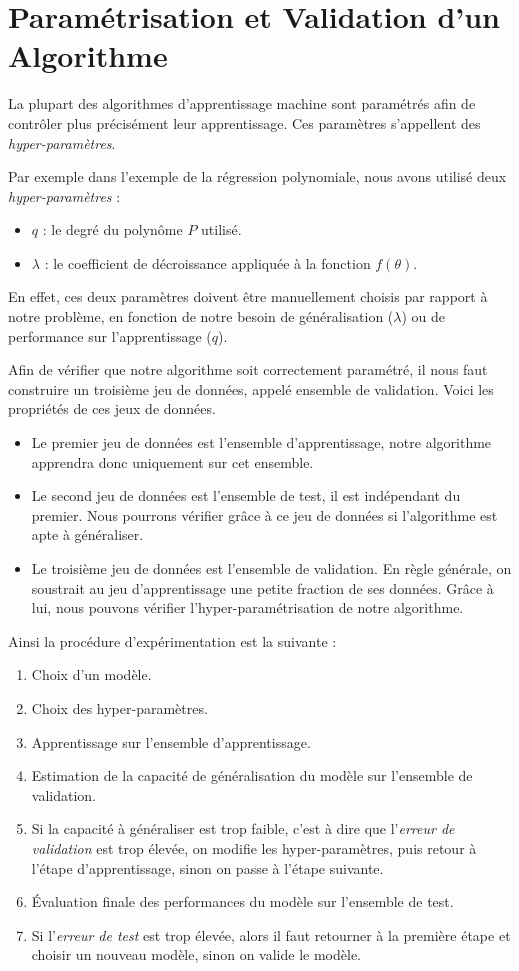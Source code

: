\documentclass[a4paper, 11pt]{report}
\begin{document}
\section{Paramétrisation et Validation d'un Algorithme}
La plupart des algorithmes d'apprentissage machine sont paramétrés afin de contrôler plus précisément leur apprentissage.
Ces paramètres s'appellent des \emph{hyper-paramètres}.

Par exemple dans l'exemple de la régression polynomiale, nous avons utilisé deux \emph{hyper-paramètres} :
\begin{itemize}
	\item $q$ : le degré du polynôme $P$ utilisé.
	\item $\lambda$ : le coefficient de décroissance appliquée à la fonction $f(\theta)$.
\end{itemize}
En effet, ces deux paramètres doivent être manuellement choisis par rapport à notre problème, en fonction de notre besoin de généralisation ($\lambda$) ou de performance sur l'apprentissage ($q$).

Afin de vérifier que notre algorithme soit correctement paramétré, il nous faut construire un troisième jeu de données, appelé ensemble de validation.
Voici les propriétés de ces jeux de données.
\begin{itemize}
	\item Le premier jeu de données est l'ensemble d'apprentissage, notre algorithme apprendra donc uniquement sur cet ensemble.
	\item Le second jeu de données est l'ensemble de test, il est indépendant du premier. Nous pourrons vérifier grâce à ce jeu de données si l'algorithme est apte à généraliser.
	\item Le troisième jeu de données est l'ensemble de validation. En règle générale, on soustrait au jeu d'apprentissage une petite fraction de ses données. Grâce à lui, nous pouvons vérifier l'hyper-paramétrisation de notre algorithme.
\end{itemize}
Ainsi la procédure d'expérimentation est la suivante :
\begin{enumerate}
	\item Choix d'un modèle.
	\item Choix des hyper-paramètres.
	\item Apprentissage sur l'ensemble d'apprentissage.
	\item Estimation de la capacité de généralisation du modèle sur l'ensemble de validation.
	\item Si la capacité à généraliser est trop faible, c'est à dire que l'\emph{erreur de validation} est trop élevée, on modifie les hyper-paramètres, puis retour à l'étape d'apprentissage, sinon on passe à l'étape suivante.
	\item Évaluation finale des performances du modèle sur l'ensemble de test.
	\item Si l'\emph{erreur de test} est trop élevée, alors il faut retourner à la première étape et choisir un nouveau modèle, sinon on valide le modèle.
\end{enumerate}
	
\end{document}
